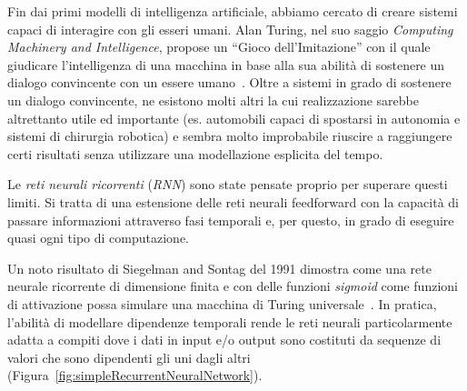 Fin dai primi modelli di intelligenza artificiale, abbiamo cercato di creare sistemi capaci di interagire con gli esseri umani.
Alan Turing, nel suo saggio \emph{Computing Machinery and Intelligence}, propose un ``Gioco dell'Imitazione'' con il quale giudicare l'intelligenza di una macchina in base alla sua abilit\`a di sostenere un dialogo convincente con un essere umano~\cite{Turing:1950}.
Oltre a sistemi in grado di sostenere un dialogo convincente, ne esistono molti altri la cui realizzazione sarebbe altrettanto utile ed importante (es. automobili capaci di spostarsi in autonomia e sistemi di chirurgia robotica) e sembra molto improbabile riuscire a raggiungere certi risultati senza utilizzare una modellazione esplicita del tempo.

Le \emph{reti neurali ricorrenti} (\emph{RNN}) sono state pensate proprio per superare questi limiti.
Si tratta di una estensione delle reti neurali feedforward con la capacit\`a di passare informazioni attraverso fasi temporali e, per questo, in grado di eseguire quasi ogni tipo di computazione.

Un noto risultato di Siegelman and Sontag del 1991 dimostra come una rete neurale ricorrente di dimensione finita e con delle funzioni \textit{sigmoid} come funzioni di attivazione possa simulare una macchina di Turing universale~\cite{Siegelmann:1991}.
In pratica, l'abilit\`a di modellare dipendenze temporali rende le reti neurali particolarmente adatta a compiti dove i dati in input e/o output sono costituti da sequenze di valori che sono dipendenti gli uni dagli altri (Figura~\ref{fig:simpleRecurrentNeuralNetwork}).

